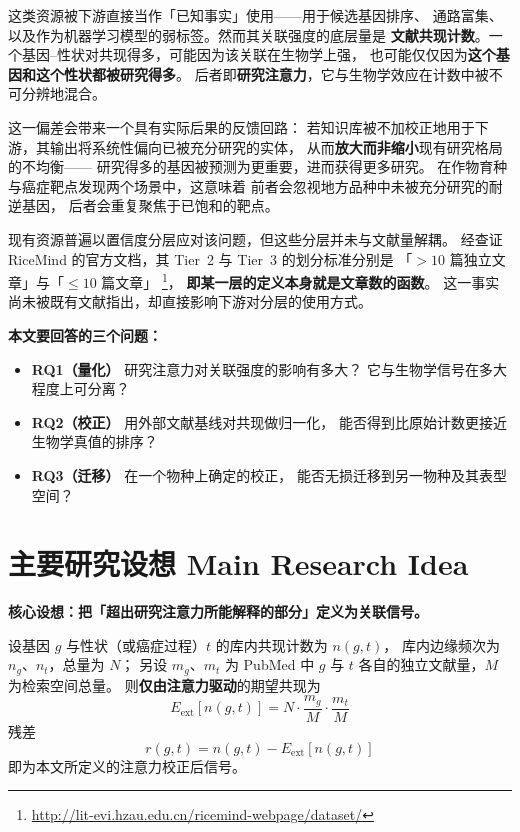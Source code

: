 \documentclass[conference]{IEEEtran}
\begin{document}
这类资源被下游直接当作「已知事实」使用——用于候选基因排序、
通路富集、以及作为机器学习模型的弱标签。然而其关联强度的底层量是
\textbf{文献共现计数}。一个基因--性状对共现得多，可能因为该关联在生物学上强，
也可能仅仅因为\textbf{这个基因和这个性状都被研究得多}。
后者即\textbf{研究注意力}，它与生物学效应在计数中被不可分辨地混合。

这一偏差会带来一个具有实际后果的反馈回路：
若知识库被不加校正地用于下游，其输出将系统性偏向已被充分研究的实体，
从而\textbf{放大而非缩小}现有研究格局的不均衡——
研究得多的基因被预测为更重要，进而获得更多研究。
在作物育种与癌症靶点发现两个场景中，这意味着
前者会忽视地方品种中未被充分研究的耐逆基因，
后者会重复聚焦于已饱和的靶点。

现有资源普遍以置信度分层应对该问题，但这些分层并未与文献量解耦。
经查证 RiceMind 的官方文档，其 Tier~2 与 Tier~3 的划分标准分别是
「$>10$ 篇独立文章」与「$\leq 10$ 篇文章」%
\footnote{\url{http://lit-evi.hzau.edu.cn/ricemind-webpage/dataset/}}，
\textbf{即某一层的定义本身就是文章数的函数}。
这一事实尚未被既有文献指出，却直接影响下游对分层的使用方式。

\textbf{本文要回答的三个问题：}
\begin{itemize}
  \item \textbf{RQ1（量化）} 研究注意力对关联强度的影响有多大？
        它与生物学信号在多大程度上可分离？
  \item \textbf{RQ2（校正）} 用外部文献基线对共现做归一化，
        能否得到比原始计数更接近生物学真值的排序？
  \item \textbf{RQ3（迁移）} 在一个物种上确定的校正，
        能否无损迁移到另一物种及其表型空间？
\end{itemize}

\section{主要研究设想 Main Research Idea}

\textbf{核心设想：把「超出研究注意力所能解释的部分」定义为关联信号。}

设基因 $g$ 与性状（或癌症过程）$t$ 的库内共现计数为 $n(g,t)$，
库内边缘频次为 $n_g$、$n_t$，总量为 $N$；
另设 $m_g$、$m_t$ 为 PubMed 中 $g$ 与 $t$ 各自的独立文献量，$M$ 为检索空间总量。
则\textbf{仅由注意力驱动}的期望共现为
\begin{equation}
E_{\text{ext}}[n(g,t)] = N \cdot \frac{m_g}{M} \cdot \frac{m_t}{M}
\end{equation}
残差
\begin{equation}
r(g,t) = n(g,t) - E_{\text{ext}}[n(g,t)]
\end{equation}
即为本文所定义的注意力校正后信号。
\end{document}
